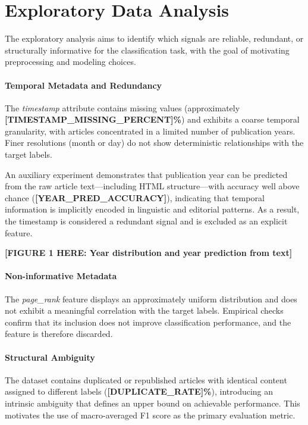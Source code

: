 \section{Exploratory Data Analysis}

The exploratory analysis aims to identify which signals are reliable, redundant, or structurally informative for the classification task, with the goal of motivating preprocessing and modeling choices.

\paragraph{Temporal Metadata and Redundancy}
The \textit{timestamp} attribute contains missing values (approximately \textbf{[TIMESTAMP\_MISSING\_PERCENT]\%}) and exhibits a coarse temporal granularity, with articles concentrated in a limited number of publication years. Finer resolutions (month or day) do not show deterministic relationships with the target labels.

An auxiliary experiment demonstrates that publication year can be predicted from the raw article text---including HTML structure---with accuracy well above chance (\textbf{[YEAR\_PRED\_ACCURACY]}), indicating that temporal information is implicitly encoded in linguistic and editorial patterns. As a result, the timestamp is considered a redundant signal and is excluded as an explicit feature.

\textbf{[FIGURE 1 HERE: Year distribution and year prediction from text]}

\paragraph{Non-informative Metadata}
The \textit{page\_rank} feature displays an approximately uniform distribution and does not exhibit a meaningful correlation with the target labels. Empirical checks confirm that its inclusion does not improve classification performance, and the feature is therefore discarded.

\paragraph{Structural Ambiguity}
The dataset contains duplicated or republished articles with identical content assigned to different labels (\textbf{[DUPLICATE\_RATE]\%}), introducing an intrinsic ambiguity that defines an upper bound on achievable performance. This motivates the use of macro-averaged F1 score as the primary evaluation metric.

